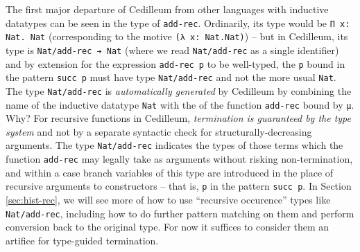 \documentclass{article}
\newcommand{\vars}[1]{{\overline{#1}}}
\begin{document}
The first major departure of Cedilleum from other languages with inductive
datatypes can be seen in the type of \texttt{add-rec}. Ordinarily, its type
would be \verb;Π x: Nat. Nat; (corresponding to the motive
\verb;(λ x: Nat.Nat);) -- but in Cedilleum, its type is \verb;Nat/add-rec ➔ Nat;
 (where we read \texttt{Nat/add-rec} as a single identifier) and by extension
for the expression \texttt{add-rec p} to be well-typed, the \texttt{p} bound in
the pattern \texttt{succ p} must have type \texttt{Nat/add-rec} and not the more
usual \texttt{Nat}. The type \texttt{Nat/add-rec} is \textit{automatically
generated} by Cedilleum by combining the name of the inductive datatype
\texttt{Nat} with the of the function \texttt{add-rec} bound by \texttt{μ}. Why?
For recursive functions in Cedilleum, \textit{termination is guaranteed by the
type system} and not by a separate syntactic check for structurally-decreasing
arguments. The type \texttt{Nat/add-rec} indicates the types of those terms
which the function \texttt{add-rec} may legally take as arguments without
risking non-termination, and within a case branch variables of this type are
introduced in the place of recursive arguments to constructors -- that is,
\texttt{p} in the pattern \texttt{succ p}. In Section \ref{sec:hist-rec}, we
will see more of how to use ``recursive occurence'' types like
\texttt{Nat/add-rec}, including how to do further pattern matching on them and
perform conversion back to the original type. For now it suffices to consider
them an artifice for type-guided termination.

\end{document}
